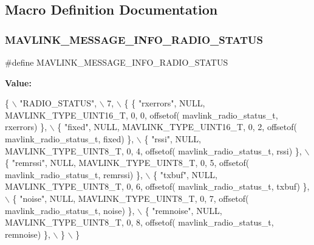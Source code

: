 \subsection{Macro Definition Documentation}
\mbox{\label{mavlink__msg__radio__status_8h_a339821eae6523b2cb6c5dfe58fd7ab55}} 
\subsubsection{M\+A\+V\+L\+I\+N\+K\+\_\+\+M\+E\+S\+S\+A\+G\+E\+\_\+\+I\+N\+F\+O\+\_\+\+R\+A\+D\+I\+O\+\_\+\+S\+T\+A\+T\+US}
{\footnotesize\ttfamily \#define M\+A\+V\+L\+I\+N\+K\+\_\+\+M\+E\+S\+S\+A\+G\+E\+\_\+\+I\+N\+F\+O\+\_\+\+R\+A\+D\+I\+O\+\_\+\+S\+T\+A\+T\+US}

{\bfseries Value\+:}
\begin{DoxyCode}
\{ \(\backslash\)
    \textcolor{stringliteral}{"RADIO\_STATUS"}, \(\backslash\)
    7, \(\backslash\)
    \{  \{ \textcolor{stringliteral}{"rxerrors"}, NULL, MAVLINK_TYPE_UINT16_T, 0, 0, offsetof(
      mavlink_radio_status_t, rxerrors) \}, \(\backslash\)
         \{ \textcolor{stringliteral}{"fixed"}, NULL, MAVLINK_TYPE_UINT16_T, 0, 2, offsetof(
      mavlink_radio_status_t, fixed) \}, \(\backslash\)
         \{ \textcolor{stringliteral}{"rssi"}, NULL, MAVLINK_TYPE_UINT8_T, 0, 4, offsetof(
      mavlink_radio_status_t, rssi) \}, \(\backslash\)
         \{ \textcolor{stringliteral}{"remrssi"}, NULL, MAVLINK_TYPE_UINT8_T, 0, 5, offsetof(
      mavlink_radio_status_t, remrssi) \}, \(\backslash\)
         \{ \textcolor{stringliteral}{"txbuf"}, NULL, MAVLINK_TYPE_UINT8_T, 0, 6, offsetof(
      mavlink_radio_status_t, txbuf) \}, \(\backslash\)
         \{ \textcolor{stringliteral}{"noise"}, NULL, MAVLINK_TYPE_UINT8_T, 0, 7, offsetof(
      mavlink_radio_status_t, noise) \}, \(\backslash\)
         \{ \textcolor{stringliteral}{"remnoise"}, NULL, MAVLINK_TYPE_UINT8_T, 0, 8, offsetof(
      mavlink_radio_status_t, remnoise) \}, \(\backslash\)
         \} \(\backslash\)
\}
\end{DoxyCode}
\mbox{\label{mavlink__msg__radio__status_8h_ae6a6f9e6599496c1da57278227dbbe62}} 
